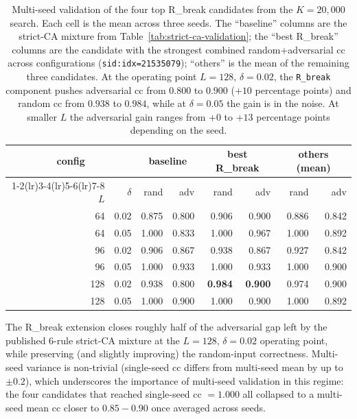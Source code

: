 \documentclass[11pt,a4paper]{article}
\newcommand{\sid}[1]{\texttt{sid:}\allowbreak\texttt{#1}}
\begin{document}
\begin{table}[h]\centering\small
\begin{tabular}{r r r r r r r r}
\toprule
\multicolumn{2}{c}{config} & \multicolumn{2}{c}{baseline} &
   \multicolumn{2}{c}{best R\_break} & \multicolumn{2}{c}{others (mean)} \\
\cmidrule(lr){1-2}\cmidrule(lr){3-4}\cmidrule(lr){5-6}\cmidrule(lr){7-8}
$L$ & $\delta$
    & rand & adv
    & rand & adv
    & rand & adv \\
\midrule
64  & 0.02 & 0.875 & 0.800 & 0.906 & 0.900 & 0.886 & 0.842 \\
64  & 0.05 & 1.000 & 0.833 & 1.000 & 0.967 & 1.000 & 0.892 \\
96  & 0.02 & 0.906 & 0.867 & 0.938 & 0.867 & 0.927 & 0.842 \\
96  & 0.05 & 1.000 & 0.933 & 1.000 & 0.933 & 1.000 & 0.900 \\
128 & 0.02 & 0.938 & 0.800 & \textbf{0.984} & \textbf{0.900} & 0.974 & 0.900 \\
128 & 0.05 & 1.000 & 0.900 & 1.000 & 0.900 & 1.000 & 0.892 \\
\bottomrule
\end{tabular}
\caption{Multi-seed validation of the four top R\_break candidates
from the \(K = 20{,}000\) search.  Each cell is the mean across three
seeds.  The ``baseline'' columns are the strict-CA mixture from
Table~\ref{tab:strict-ca-validation}; the ``best R\_break'' columns
are the candidate with the strongest combined random+adversarial cc
across configurations (\sid{idx=21535079}); ``others'' is the mean
of the remaining three candidates.  At the operating point
\(L=128,\,\delta=0.02\), the \texttt{R\_break} component pushes
adversarial cc from \(0.800\) to \(0.900\) (\(+10\) percentage
points) and random cc from \(0.938\) to \(0.984\), while at
\(\delta=0.05\) the gain is in the noise.  At smaller \(L\) the
adversarial gain ranges from \(+0\) to \(+13\) percentage points
depending on the seed.}
\label{tab:r-break-multiseed}
\end{table}

The R\_break extension closes roughly half of the
adversarial gap left by the published 6-rule strict-CA mixture at
the \(L=128,\,\delta=0.02\) operating point, while preserving (and
slightly improving) the random-input correctness.  Multi-seed
variance is non-trivial (single-seed cc differs from multi-seed
mean by up to \(\pm 0.2\)), which underscores the importance of
multi-seed validation in this regime: the four candidates that
reached single-seed cc \(=1.000\) all collapsed to a multi-seed
mean cc closer to \(0.85{-}0.90\) once averaged across seeds.
\end{document}
